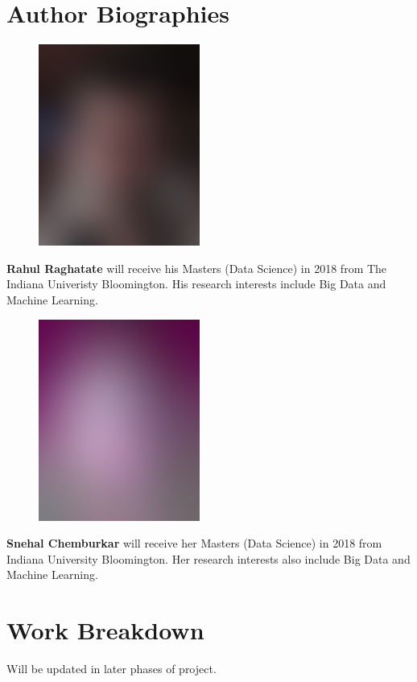 \documentclass[9pt,twocolumn,twoside]{styles/osajnl}
\begin{document}
\section*{Author Biographies}
\begingroup \setlength\intextsep{0pt}
\begin{minipage}[t][3.2cm][t]{1.0\columnwidth}
  \begin{figure}
    \includegraphics[width=0.25\columnwidth]{images/john_smith.eps}
  \end{figure}
  \noindent
  {\bfseries Rahul Raghatate} will receive his Masters (Data Science)
  in 2018 from The Indiana Univeristy Bloomington. His research
  interests include Big Data and Machine Learning.
\end{minipage}
\begin{minipage}[t][3.2cm][t]{1.0\columnwidth} %
  \begin{figure}
    \includegraphics[width=0.25\columnwidth]{images/alice_smith.eps}
  \end{figure}
  \noindent
  {\bfseries Snehal Chemburkar} will receive her Masters (Data
  Science) in 2018 from Indiana University Bloomington. Her research
  interests also include Big Data and Machine Learning.
\end{minipage}
\endgroup
\newpage

\appendix
\section{Work Breakdown}
Will be updated in later phases of project.
\end{document}
